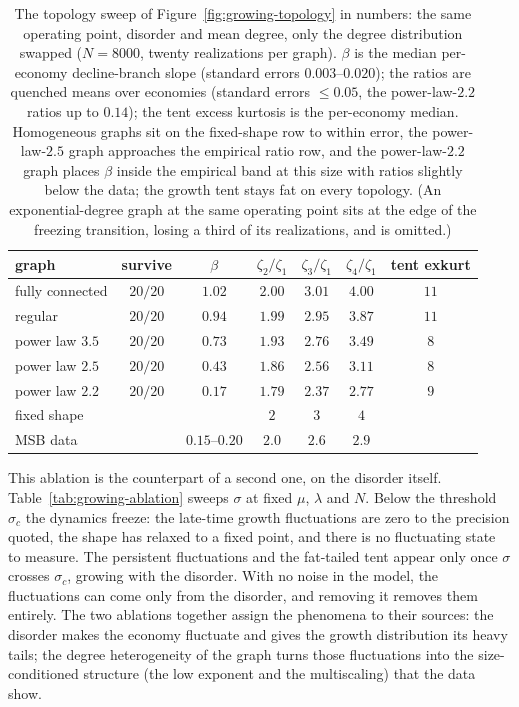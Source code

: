 \begin{table}[htbp]
    \centering
    \begin{tabular}{lcccccc}
        \hline
        graph & survive & $\beta$ & $\zeta_2/\zeta_1$ & $\zeta_3/\zeta_1$
              & $\zeta_4/\zeta_1$ & tent exkurt \\
        \hline
        fully connected & $20/20$ & $1.02$ & $2.00$ & $3.01$ & $4.00$ & $11$ \\
        regular         & $20/20$ & $0.94$ & $1.99$ & $2.95$ & $3.87$ & $11$ \\
        power law $3.5$ & $20/20$ & $0.73$ & $1.93$ & $2.76$ & $3.49$ & $8$  \\
        power law $2.5$ & $20/20$ & $0.43$ & $1.86$ & $2.56$ & $3.11$ & $8$  \\
        power law $2.2$ & $20/20$ & $0.17$ & $1.79$ & $2.37$ & $2.77$ & $9$  \\
        \hline
        fixed shape     &         &        & $2$    & $3$    & $4$    &      \\
        MSB data        &         & $0.15$--$0.20$ & $2.0$ & $2.6$ & $2.9$ &  \\
        \hline
    \end{tabular}
    \caption{The topology sweep of Figure~\ref{fig:growing-topology} in numbers: the same
    operating point, disorder and mean degree, only the degree distribution swapped
    ($N = 8000$, twenty realizations per graph). $\beta$ is the median per-economy
    decline-branch slope (standard errors $0.003$--$0.020$); the ratios are quenched means
    over economies (standard errors $\le 0.05$, the power-law-$2.2$ ratios up to
    $0.14$); the tent excess kurtosis
    is the per-economy median. Homogeneous graphs sit on the fixed-shape row to within
    error, the power-law-$2.5$ graph approaches the empirical ratio row, and the
    power-law-$2.2$ graph places $\beta$ inside the empirical band at this size with
    ratios slightly below the data; the growth
    tent stays fat on every topology. (An exponential-degree graph at the same operating
    point sits at the edge of the freezing transition, losing a third of its realizations,
    and is omitted.)}
    \label{tab:growing-topology}
\end{table}

This ablation is the counterpart of a second one, on the disorder itself.
Table~\ref{tab:growing-ablation} sweeps $\sigma$ at fixed $\mu$, $\lambda$
and $N$. Below the threshold $\sigma_c$ the dynamics freeze: the late-time
growth fluctuations are zero to the precision quoted, the shape has relaxed to a fixed
point, and there is no fluctuating state to measure. The persistent fluctuations and
the fat-tailed tent appear only once $\sigma$ crosses $\sigma_c$, growing with the
disorder. With no noise in the model, the fluctuations can come only from the disorder,
and removing it removes them entirely. The two ablations together assign the phenomena
to their sources: the disorder makes the economy fluctuate and gives the growth
distribution its heavy tails; the degree heterogeneity of the graph turns those
fluctuations into the size-conditioned structure (the low exponent and the
multiscaling) that the data show.

